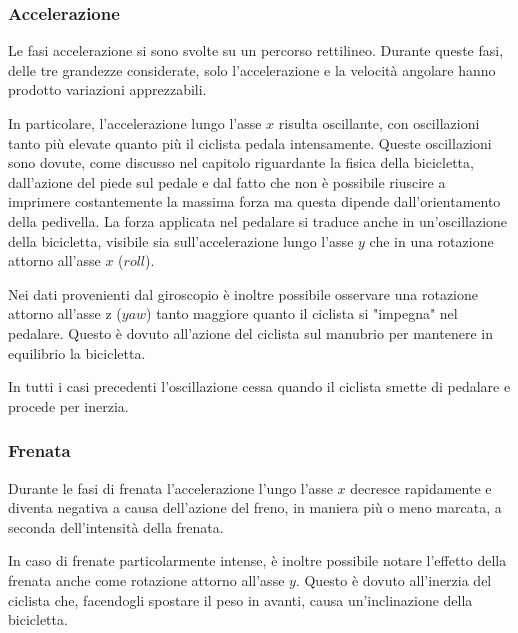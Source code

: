 \documentclass[class=article]{standalone}
\begin{document}
	\subsubsection{Accelerazione}
	Le fasi accelerazione si sono svolte su un percorso rettilineo. Durante queste fasi, delle tre grandezze considerate, solo l'accelerazione e la velocità angolare hanno prodotto variazioni apprezzabili.
	
	In particolare, l'accelerazione lungo l'asse \(x\) risulta oscillante, con oscillazioni tanto più elevate quanto più il ciclista pedala intensamente. Queste oscillazioni sono dovute, come discusso nel capitolo riguardante la fisica della bicicletta, dall'azione del piede sul pedale e dal fatto che non è possibile riuscire a imprimere costantemente la massima forza ma questa dipende dall'orientamento della pedivella. La forza applicata nel pedalare si traduce anche in un'oscillazione della bicicletta, visibile sia sull'accelerazione lungo l'asse \(y\) che in una rotazione attorno all'asse \(x\) (\(roll\)).
	
	Nei dati provenienti dal giroscopio è inoltre possibile osservare una rotazione attorno all'asse z (\(yaw\)) tanto maggiore quanto il ciclista si "impegna" nel pedalare. Questo è dovuto all'azione del ciclista sul manubrio per mantenere in equilibrio la bicicletta.
	
	In tutti i casi precedenti l'oscillazione cessa quando il ciclista smette di pedalare e procede per inerzia.
	
	\subsubsection{Frenata}
	Durante le fasi di frenata l'accelerazione l'ungo l'asse \(x\) decresce rapidamente e diventa negativa a causa dell'azione del freno, in maniera più o meno marcata, a seconda dell'intensità della frenata.
	
	In caso di frenate particolarmente intense, è inoltre possibile notare l'effetto della frenata anche come rotazione attorno all'asse \(y\). Questo è dovuto all'inerzia del ciclista che, facendogli spostare il peso in avanti, causa un'inclinazione della bicicletta.
	
\end{document}
